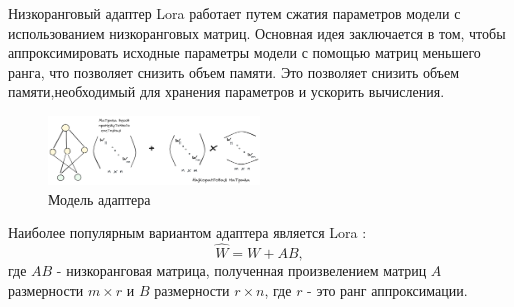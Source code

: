Низкоранговый адаптер Lora работает путем сжатия 
параметров модели с использованием низкоранговых матриц. 
Основная идея заключается в том, 
чтобы аппроксимировать исходные параметры модели с
помощью матриц меньшего ранга, что позволяет снизить объем памяти.
Это позволяет снизить объем памяти,необходимый для хранения параметров и ускорить вычисления. 
\begin{figure}[h]
    \centering
    \includegraphics[width=0.5\textwidth]{assets/ml/adapter/adapter.excalidraw.png}
    \caption{Модель адаптера  \cite{hu2021lora}}
    \label{sd_learning}
\end{figure}

Наиболее популярным вариантом адаптера является Lora \cite{hu2021lora}:
\begin{equation}
    \hat{W} = W + AB,
\end{equation}
где  $AB$ - низкоранговая матрица, полученная произвелением 
матриц $A$ размерности \( m \times r \) и  $B$ размерности  $r \times n$,
где \( r \) - это ранг аппроксимации.
